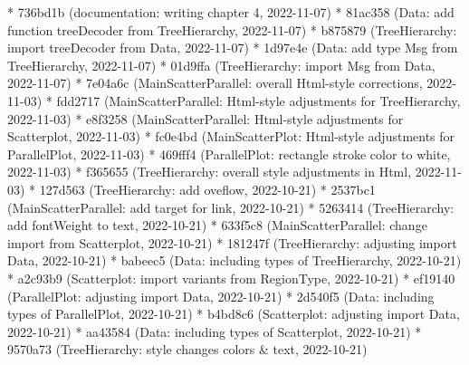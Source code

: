 \documentclass[usegeometry=true]{scrartcl}
\begin{document}
* 736bd1b (documentation: writing chapter 4, 2022-11-07)\newline
* 81ac358 (Data: add function treeDecoder from TreeHierarchy, 2022-11-07) \newline
* b875879 (TreeHierarchy: import treeDecoder from Data, 2022-11-07)\newline
* 1d97e4e (Data: add type Msg from TreeHierarchy, 2022-11-07)\newline
* 01d9ffa (TreeHierarchy: import Msg from Data, 2022-11-07)\newline
* 7e04a6c (MainScatterParallel: overall Html-style corrections, 2022-11-03) \newline
* fdd2717 (MainScatterParallel: Html-style adjustments for TreeHierarchy, 2022-11-03)\newline
* e8f3258 (MainScatterParallel: Html-style adjustments for Scatterplot, 2022-11-03)\newline
* fc0e4bd (MainScatterPlot: Html-style adjustments for ParallelPlot, 2022-11-03)\newline
* 469fff4 (ParallelPlot: rectangle stroke color to white, 2022-11-03)\newline
* f365655 (TreeHierarchy: overall style adjustments in Html, 2022-11-03)\newline
* 127d563 (TreeHierarchy: add oveflow, 2022-10-21)\newline
* 2537bc1 (MainScatterParallel: add target for link, 2022-10-21) \newline
* 5263414 (TreeHierarchy: add fontWeight to text, 2022-10-21)\newline
* 633f5c8 (MainScatterParallel: change import from Scatterplot, 2022-10-21)\newline
* 181247f (TreeHierarchy: adjusting import Data, 2022-10-21)\newline
* babeec5 (Data: including types of TreeHierarchy, 2022-10-21)\newline
* a2c93b9 (Scatterplot: import variants from RegionType, 2022-10-21) \newline
* ef19140 (ParallelPlot: adjusting import Data, 2022-10-21)\newline
* 2d540f5 (Data: including types of ParallelPlot, 2022-10-21)\newline
* b4bd8c6 (Scatterplot: adjusting import Data, 2022-10-21)\newline
* aa43584 (Data: including types of Scatterplot, 2022-10-21)\newline
* 9570a73 (TreeHierarchy: style changes colors \& text, 2022-10-21) \newline
\end{document}
